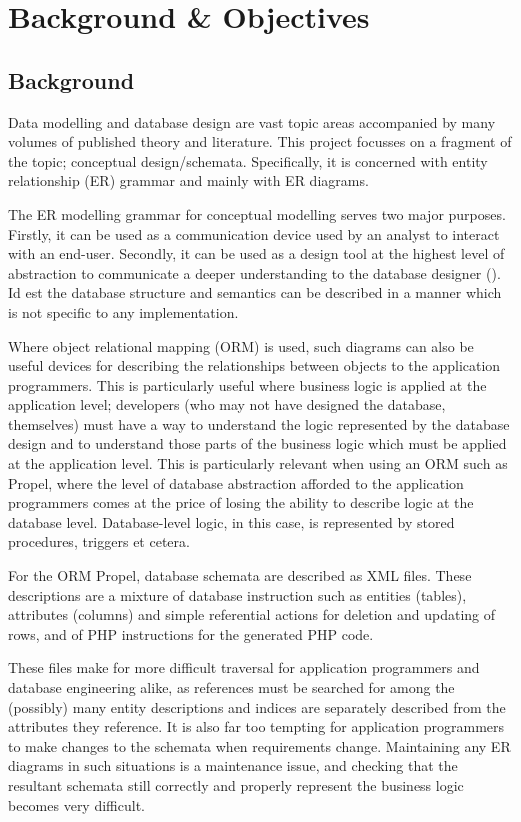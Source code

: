 \cleardoublepage
\chapter{Background \& Objectives} %
\section{Background}
Data modelling and database design are vast topic areas accompanied by many volumes of published theory and literature. This project focusses on a fragment of the topic; conceptual design\slash schemata. Specifically, it is concerned with entity relationship (ER) grammar and mainly with ER diagrams.

The ER modelling grammar for conceptual modelling serves two major purposes. Firstly, it can be used as a communication device used by an analyst to interact with an end-user. Secondly, it can be used as a design tool at the highest level of abstraction to communicate a deeper understanding to the database designer (\cite{DataModelingAndDatabaseDesign}). Id est the database structure and semantics can be described in a manner which is not specific to any implementation.

Where object relational mapping (ORM) is used, such diagrams can also be useful devices for describing the relationships between objects to the application programmers. This is particularly useful where business logic is applied at the application level; developers (who may not have designed the database, themselves) must have a way to understand the logic represented by the database design and to understand those parts of the business logic which must be applied at the application level. This is particularly relevant when using an ORM such as Propel, where the level of database abstraction afforded to the application programmers comes at the price of losing the ability to describe logic at the database level. Database-level logic, in this case, is represented by stored procedures, triggers et cetera.

For the ORM Propel, database schemata are described as XML files. These descriptions are a mixture of database instruction such as entities (tables), attributes (columns) and simple referential actions for deletion and updating of rows, and of PHP instructions for the generated PHP code.

These files make for more difficult traversal for application programmers and database engineering alike, as references must be searched for among the (possibly) many entity descriptions and indices are separately described from the attributes they reference. It is also far too tempting for application programmers to make changes to the schemata when requirements change. Maintaining any ER diagrams in such situations is a maintenance issue, and checking that the resultant schemata still correctly and properly represent the business logic becomes very difficult.

